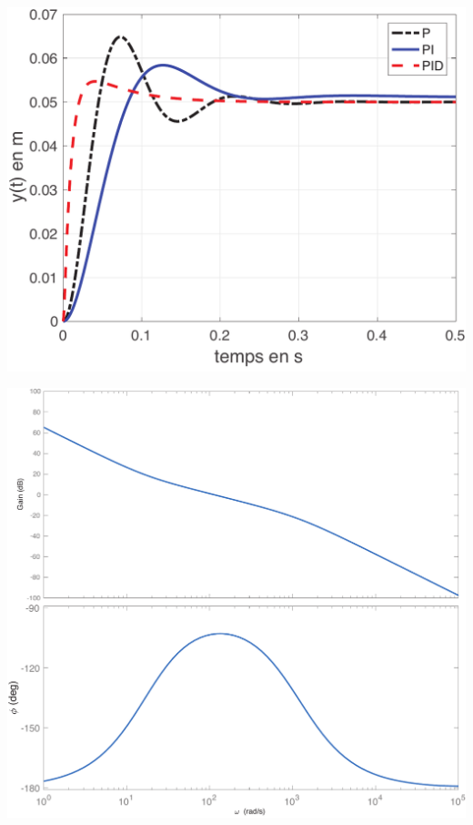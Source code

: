 \documentclass[10pt,fleqn]{article} %
\begin{document}
\begin{multicols}{2}
\begin{center}
\includegraphics[width=1.0\linewidth]{images/matlab/rep_temp.pdf}
\end{center}

\begin{center}
\includegraphics[width=1.0\linewidth]{images/matlab/bode_pid.pdf}
\end{center}

\end{multicols}
\end{document}
